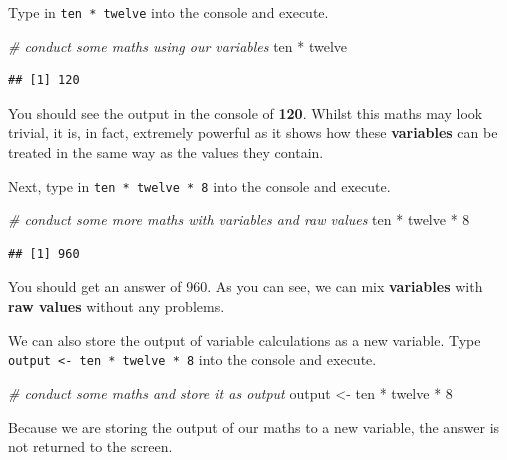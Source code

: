 \documentclass[
]{book}
\newenvironment{Shaded}{\begin{snugshade}}{\end{snugshade}}
\newcommand{\CommentTok}[1]{\textcolor[rgb]{0.56,0.35,0.01}{\textit{#1}}}
\newcommand{\DecValTok}[1]{\textcolor[rgb]{0.00,0.00,0.81}{#1}}
\newcommand{\NormalTok}[1]{#1}
\newcommand{\OtherTok}[1]{\textcolor[rgb]{0.56,0.35,0.01}{#1}}
\newcommand{\SpecialCharTok}[1]{\textcolor[rgb]{0.00,0.00,0.00}{#1}}
\begin{document}
Type in \texttt{ten\ *\ twelve} into the console and execute.

\begin{Shaded}
\begin{Highlighting}[]
\CommentTok{\# conduct some maths  using our variables}
\NormalTok{ten }\SpecialCharTok{*}\NormalTok{ twelve}
\end{Highlighting}
\end{Shaded}

\begin{verbatim}
## [1] 120
\end{verbatim}

You should see the output in the console of \textbf{120}. Whilst this maths may look trivial, it is, in fact, extremely powerful as it shows how these \textbf{variables} can be treated in the same way as the values they contain.

Next, type in \texttt{ten\ *\ twelve\ *\ 8} into the console and execute.

\begin{Shaded}
\begin{Highlighting}[]
\CommentTok{\# conduct some more maths with variables and raw values}
\NormalTok{ten }\SpecialCharTok{*}\NormalTok{ twelve }\SpecialCharTok{*} \DecValTok{8}
\end{Highlighting}
\end{Shaded}

\begin{verbatim}
## [1] 960
\end{verbatim}

You should get an answer of 960. As you can see, we can mix \textbf{variables} with \textbf{raw values} without any problems.

We can also store the output of variable calculations as a new variable. Type \texttt{output\ \textless{}-\ ten\ *\ twelve\ *\ 8} into the console and execute.

\begin{Shaded}
\begin{Highlighting}[]
\CommentTok{\# conduct some maths and store it as output}
\NormalTok{output }\OtherTok{\textless{}{-}}\NormalTok{ ten }\SpecialCharTok{*}\NormalTok{ twelve }\SpecialCharTok{*} \DecValTok{8}
\end{Highlighting}
\end{Shaded}

Because we are storing the output of our maths to a new variable, the answer is not returned to the screen.
\end{document}

